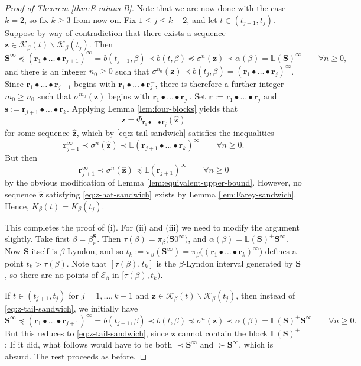 \documentclass[11pt]{amsart}
\theoremstyle{definition}
\theoremstyle{remark}
\numberwithin{equation}{section}
\renewcommand{\L}{\ensuremath{\mathbb{L}}}
\newcommand{\EE}{\mathscr{E}}
\newcommand{\s}{ {\mathbf{s}}}
\newcommand{\cs}{ {\mathbf{S}}}
\renewcommand{\r}{ {\mathbf{r}}}
\newcommand{\z}{\mathbf{z}}
\newcommand{\f}{\infty}
\newcommand{\al}{\alpha}
\newcommand{\lle}{\preccurlyeq}
\begin{document}
\begin{proof}[Proof of Theorem \ref{thm:E-minus-B}]
Note that we are now done with the case $k=2$, so fix $k\geq 3$ from now on.
Fix $1\leq j\leq k-2$, and let $t\in(t_{j+1},t_j)$. Suppose by way of contradiction that there exists a sequence $\z\in \mathcal{K}_\beta(t)\backslash \mathcal{K}_\beta(t_j)$. Then
\begin{equation} \label{eq:z-tail-sandwich}
\cs^\f\lle (\r_1\bullet\dots\bullet\r_{j+1})^\f=b(t_{j+1},\beta)\prec b(t,\beta)\lle \sigma^n(\z)\prec\alpha(\beta)=\L(\cs)^\f \qquad \forall n\geq 0,
\end{equation}
and there is an integer $n_0\geq 0$ such that $\sigma^{n_0}(\z)\prec b(t_j,\beta)=(\r_1\bullet\dots\bullet \r_j)^\f$.
Since $\r_1\bullet\dots\bullet\r_{j+1}$ begins with $\r_1\bullet\dots\bullet\r_j^-$, there is  therefore a further integer $m_0\geq n_0$ such that $\sigma^{m_0}(\z)$ begins with $\r_1\bullet\dots\bullet\r_j^-$. Set $\r:=\r_1\bullet\dots\bullet\r_j$ and $\s:=\r_{j+1}\bullet\dots\bullet\r_k$. Applying Lemma \ref{lem:four-blocks} yields that
\[
\z=\Phi_{\r_1\bullet\dots\bullet \r_j}(\hat{\z})
\]
for some sequence $\hat{\z}$, which by \eqref{eq:z-tail-sandwich} satisfies the inequalities
\begin{equation} \label{eq:wider-z-hat-sandwich}
\r_{j+1}^\f\prec\sigma^n(\hat{\z})\prec \L(\r_{j+1}\bullet\dots\bullet\r_k)^\f\qquad \forall n\geq 0.
\end{equation}
But then
\begin{equation} \label{eq:z-hat-sandwich}
\r_{j+1}^\f\prec\sigma^n(\hat{\z})\lle \L(\r_{j+1})^\f\qquad \forall n\geq 0
\end{equation}
by the obvious modification of Lemma \ref{lem:equivalent-upper-bound}. However, no sequence $\hat{\z}$ satisfying \eqref{eq:z-hat-sandwich} exists by Lemma \ref{lem:Farey-sandwich}. Hence, $K_\beta(t)=K_\beta(t_j)$.

{
This completes the proof of (i). For (ii) and (iii) we need to modify the argument slightly. Take first $\beta=\beta_r^\cs$. Then $\tau(\beta)=\pi_\beta\big(\cs 0^\f\big)$, and $\al(\beta)=\L(\cs)^+\cs^\f$. Now $\cs$ itself is $\beta$-Lyndon, and so $t_k:=\pi_\beta(\cs^\f)=\pi_\beta\big((\r_1\bullet\dots\bullet\r_k)^\f\big)$ defines a point $t_k>\tau(\beta)$. Note that $[\tau(\beta),t_k]$ is the $\beta$-Lyndon interval generated by $\cs$, so there are no points of $\EE_\beta$ in $[\tau(\beta),t_k)$.

If $t\in(t_{j+1},t_j)$ for $j=1,\dots,k-1$ and $\z\in \mathcal{K}_\beta(t)\backslash \mathcal{K}_\beta(t_j)$, then instead of  \eqref{eq:z-tail-sandwich}, we initially have
\[
\cs^\f\lle (\r_1\bullet\dots\bullet\r_{j+1})^\f=b(t_{j+1},\beta)\prec b(t,\beta)\lle \sigma^n(\z)\prec\alpha(\beta)=\L(\cs)^+\cs^\f \qquad \forall n\geq 0.
\]
But this reduces to \eqref{eq:z-tail-sandwich}, since $\z$ cannot contain the block $\L(\cs)^+$: If it did, what follows would have to be both $\prec\cs^\f$ and $\succ\cs^\f$, which is absurd. The rest proceeds as before.

}
\end{proof}
\end{document}
